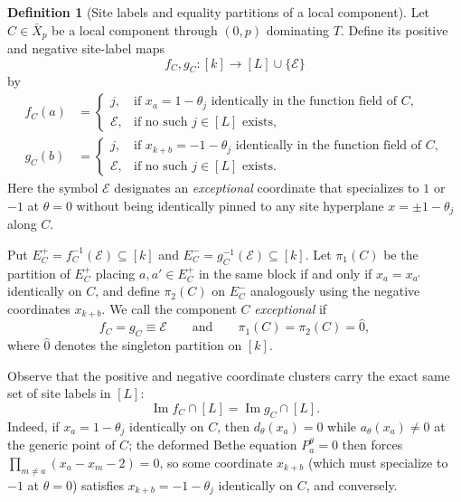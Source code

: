 \documentclass[11pt]{article}
\theoremstyle{definition}
\newtheorem{definition}[proposition]{Definition}
\DeclareMathOperator{\Ima}{Im}
\begin{document}
\begin{definition}[Site labels and equality partitions of a local component]
\label{def:component-labels-and-partitions}
Let $C\in\bar{X}_p$ be a local component through $(0,p)$
dominating $T$. Define its positive and negative site-label maps
\[
 f_C,g_C:[k]\longrightarrow[L]\cup\{\mathcal{E}\}
\]
by
\[
 \begin{aligned}
 f_C(a)&=
 \begin{cases}
 j, & \text{if }x_a=1-\theta_j\text{ identically in the function field of }C,\\
 \mathcal{E}, & \text{if no such }j\in[L]\text{ exists},
 \end{cases}\\[4pt]
 g_C(b)&=
 \begin{cases}
 j, & \text{if }x_{k+b}=-1-\theta_j\text{ identically in the function field of }C,\\
 \mathcal{E}, & \text{if no such }j\in[L]\text{ exists}.
 \end{cases}
 \end{aligned}
\]
Here the symbol $\mathcal{E}$ designates an \emph{exceptional} coordinate
that specializes to $1$ or $-1$ at $\theta=0$ without being identically pinned to any site hyperplane $x= \pm 1-\theta_j$ along $C$.

Put $E_C^+=f_C^{-1}(\mathcal{E})\subseteq[k]$ and
$E_C^-=g_C^{-1}(\mathcal{E})\subseteq[k]$. Let $\pi_1(C)$ be the partition of
$E_C^+$ placing $a,a'\in E_C^+$ in the same block if and only if
$x_a=x_{a'}$ identically on $C$, and define $\pi_2(C)$ on $E_C^-$ analogously
using the negative coordinates $x_{k+b}$. We call the component $C$ \emph{exceptional} if
\[
 f_C=g_C\equiv\mathcal{E}
 \qquad\text{and}\qquad \pi_1(C)=\pi_2(C)=\hat{0},
\]
where $\hat{0}$ denotes the singleton partition on $[k]$.
\end{definition}

Observe that the positive and negative coordinate clusters carry the exact same set of site labels in $[L]$:
\[
 \Ima f_C\cap[L]=\Ima g_C\cap[L].
\]
Indeed, if $x_a=1-\theta_j$ identically on $C$, then $d_\theta(x_a)=0$ while $a_\theta(x_a)\ne 0$ at the generic point of $C$; the deformed Bethe equation $P_a^\theta=0$ then forces $\prod_{m\ne a}(x_a-x_m-2)=0$, so some coordinate $x_{k+b}$ (which must specialize to $-1$ at $\theta=0$) satisfies $x_{k+b}=-1-\theta_j$ identically on $C$, and conversely.
\end{document}
